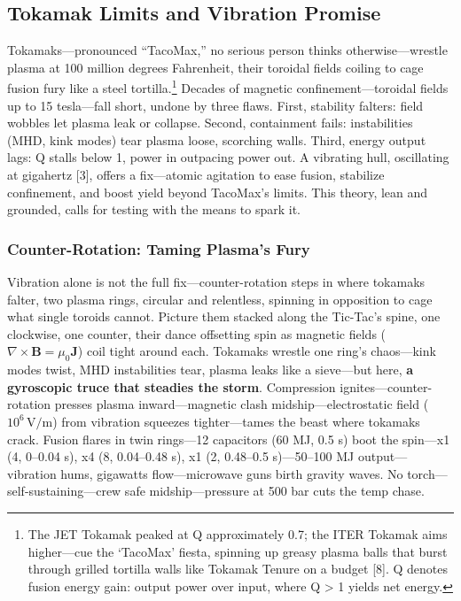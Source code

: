 \documentclass[11pt]{article}
\begin{document}
	\subsection{Tokamak Limits and Vibration Promise}
	Tokamaks—pronounced “TacoMax,” no serious person thinks otherwise—wrestle plasma at 100 million degrees Fahrenheit, their toroidal fields coiling to cage fusion fury like a steel tortilla.\footnote{The JET Tokamak peaked at Q approximately 0.7; the ITER Tokamak aims higher—cue the ‘TacoMax’ fiesta, spinning up greasy plasma balls that burst through grilled tortilla walls like Tokamak Tenure on a budget [8]. Q denotes fusion energy gain: output power over input, where Q > 1 yields net energy.} Decades of magnetic confinement—toroidal fields up to 15 tesla—fall short, undone by three flaws. First, stability falters: field wobbles let plasma leak or collapse. Second, containment fails: instabilities (MHD, kink modes) tear plasma loose, scorching walls. Third, energy output lags: Q stalls below 1, power in outpacing power out. A vibrating hull, oscillating at gigahertz [3], offers a fix—atomic agitation to ease fusion, stabilize confinement, and boost yield beyond TacoMax’s limits. This theory, lean and grounded, calls for testing with the means to spark it.
	
	\subsubsection{Counter-Rotation: Taming Plasma’s Fury}
	Vibration alone is not the full fix—counter-rotation steps in where tokamaks falter, two plasma rings, circular and relentless, spinning in opposition to cage what single toroids cannot. Picture them stacked along the Tic-Tac’s spine, one clockwise, one counter, their dance offsetting spin as magnetic fields (\(\nabla \times \mathbf{B} = \mu_0 \mathbf{J}\)) coil tight around each. Tokamaks wrestle one ring’s chaos—kink modes twist, MHD instabilities tear, plasma leaks like a sieve—but here, \textbf{a gyroscopic truce that steadies the storm}. Compression ignites—counter-rotation presses plasma inward—magnetic clash midship—electrostatic field (\(10^6 \, \text{V/m}\)) from vibration squeezes tighter—tames the beast where tokamaks crack. Fusion flares in twin rings—12 capacitors (60 MJ, 0.5 s) boot the spin—x1 (4, 0–0.04 s), x4 (8, 0.04–0.48 s), x1 (2, 0.48–0.5 s)—50–100 MJ output—vibration hums, gigawatts flow—microwave guns birth gravity waves. No torch—self-sustaining—crew safe midship—pressure at 500 bar cuts the temp chase.
	
\end{document}
